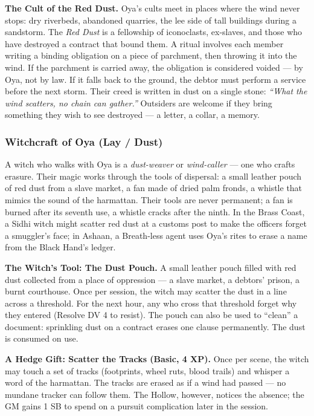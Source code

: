 \textbf{The Cult of the Red Dust.} Oya's cults meet in places where the wind never stops: dry riverbeds, abandoned quarries, the lee side of tall buildings during a sandstorm. The \textit{Red Dust} is a fellowship of iconoclasts, ex-slaves, and those who have destroyed a contract that bound them. A ritual involves each member writing a binding obligation on a piece of parchment, then throwing it into the wind. If the parchment is carried away, the obligation is considered voided --- by Oya, not by law. If it falls back to the ground, the debtor must perform a service before the next storm. Their creed is written in dust on a single stone: \textit{``What the wind scatters, no chain can gather.''} Outsiders are welcome if they bring something they wish to see destroyed --- a letter, a collar, a memory.

\subsubsection*{Witchcraft of Oya (Lay / Dust)}

A witch who walks with Oya is a \textit{dust-weaver} or \textit{wind-caller} --- one who crafts erasure. Their magic works through the tools of dispersal: a small leather pouch of red dust from a slave market, a fan made of dried palm fronds, a whistle that mimics the sound of the harmattan. Their tools are never permanent; a fan is burned after its seventh use, a whistle cracks after the ninth. In the Brass Coast, a Sidhi witch might scatter red dust at a customs post to make the officers forget a smuggler's face; in Ashaan, a Breath-less agent uses Oya's rites to erase a name from the Black Hand's ledger.

\textbf{The Witch's Tool: The Dust Pouch.} A small leather pouch filled with red dust collected from a place of oppression --- a slave market, a debtors' prison, a burnt courthouse. Once per session, the witch may scatter the dust in a line across a threshold. For the next hour, any who cross that threshold forget why they entered (Resolve DV 4 to resist). The pouch can also be used to ``clean'' a document: sprinkling dust on a contract erases one clause permanently. The dust is consumed on use.

\textbf{A Hedge Gift: Scatter the Tracks (Basic, 4 XP).} Once per scene, the witch may touch a set of tracks (footprints, wheel ruts, blood trails) and whisper a word of the harmattan. The tracks are erased as if a wind had passed --- no mundane tracker can follow them. The Hollow, however, notices the absence; the GM gains 1 SB to spend on a pursuit complication later in the session.

